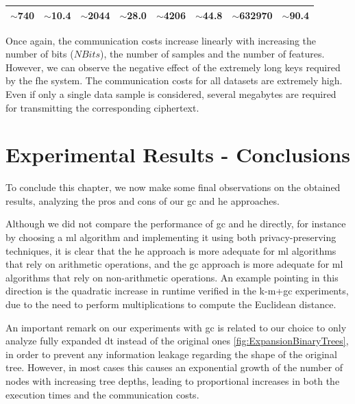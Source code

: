 \begin{table}[H]
\begin{tabular}{|c|c|c|c|c|c|c|c|}
$\sim$740                                                         & $\sim$10.4                                                    & $\sim$2044                                                        & $\sim$28.0                                                    & $\sim$4206                                                        & $\sim$44.8                                                    & $\sim$632970                                                      & $\sim$90.4                                                    \\ \hline
\end{tabular}
\end{table}

Once again, the communication costs increase linearly with increasing the number of bits ($NBits$), the number of samples and the number of features. However, we can observe the negative effect of the extremely long keys required by the \ac{fhe} system. The communication costs for all datasets are extremely high. Even if only a single data sample is considered, several megabytes are required for transmitting the corresponding ciphertext.



\section{Experimental Results - Conclusions}
\label{sec:ExperimentalResultsConclusion}


To conclude this chapter, we now make some final observations on the obtained results, analyzing the pros and cons of our \ac{gc} and \ac{he} approaches.

Although we did not compare the performance of \ac{gc} and \ac{he} directly, for instance by choosing a \ac{ml} algorithm and implementing it using both privacy-preserving techniques, it is clear that the \ac{he} approach is more adequate for \ac{ml} algorithms that rely on arithmetic operations, and the \ac{gc} approach is more adequate for \ac{ml} algorithms that rely on non-arithmetic operations. An example pointing in this direction is the quadratic increase in runtime verified in the \ac{k-m}+\ac{gc} experiments, due to the need to perform multiplications to compute the Euclidean distance.

An important remark on our experiments with \ac{gc} is related to our choice to only analyze fully expanded \ac{dt} instead of the original ones \ref{fig:ExpansionBinaryTrees}, in order to prevent any information leakage regarding the shape of the original tree. However, in most cases this causes an exponential growth of the number of nodes with increasing tree depths, leading to proportional increases in both the execution times and the communication costs.
  

